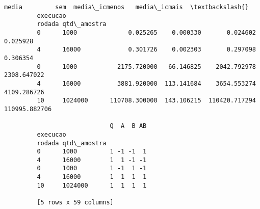 \documentclass[11pt]{article}
\begin{document}
\begin{Verbatim}[commandchars=\\\{\}]
                                     media         sem  media\_icmenos   media\_icmais  \textbackslash{}
         execucao                                                                      
         rodada qtd\_amostra                                                            
         0      1000              0.025265    0.000330       0.024602       0.025928   
         4      16000             0.301726    0.002303       0.297098       0.306354   
         0      1000           2175.720000   66.146825    2042.792978    2308.647022   
         4      16000          3881.920000  113.141684    3654.553274    4109.286726   
         10     1024000      110708.300000  143.106215  110420.717294  110995.882706   
         
                             Q  A  B AB  
         execucao                        
         rodada qtd\_amostra              
         0      1000         1 -1 -1  1  
         4      16000        1  1 -1 -1  
         0      1000         1 -1  1 -1  
         4      16000        1  1  1  1  
         10     1024000      1  1  1  1  
         
         [5 rows x 59 columns]
\end{Verbatim}
            
\end{document}
